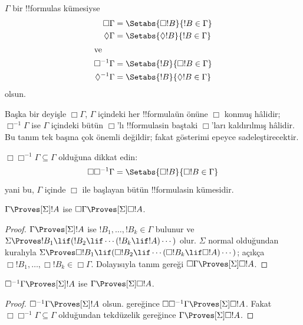 \documentclass[../../../include/open-logic-section]{subfiles}
\begin{document}
\begin{defn}
  $\Gamma$ bir !!{formula}s kümesiyse
  \begin{align*}
    \Box\Gamma & = \Setabs{\Box !B}{!B \in \Gamma}\\
    \Diamond\Gamma & = \Setabs{\Diamond !B}{!B \in \Gamma}\\
    \intertext{ve}
    \Box^{-1}\Gamma & = \Setabs{!B}{\Box !B \in \Gamma}\\
    \Diamond^{-1}\Gamma & = \Setabs{!B}{\Diamond !B \in \Gamma}\\
  \end{align*}
  olsun.
\end{defn}

Başka bir deyişle $\Box\Gamma$, $\Gamma$ içindeki her !!{formula}{}ün önüne
$\Box$ konmuş hâlidir; $\Box^{-1}\Gamma$ ise $\Gamma$ içindeki bütün
$\Box$'lı !!{formula}s{}in baştaki $\Box$'ları kaldırılmış hâlidir. Bu tanım
tek başına çok önemli değildir; fakat gösterimi epeyce sadeleştirecektir.

$\Box\Box^{-1}\Gamma\subseteq\Gamma$ olduğuna dikkat edin:
\[
\Box\Box^{-1}\Gamma = \Setabs{\Box!B}{\Box!B \in \Gamma}
\]
yani bu, $\Gamma$ içinde $\Box$ ile başlayan bütün !!{formula}s{}in kümesidir.

\begin{lem}
  $\Gamma\Proves[\Sigma]!A$ ise
  $\Box\Gamma\Proves[\Sigma]\Box!A$.
\end{lem}

\begin{proof}
  $\Gamma\Proves[\Sigma]!A$ ise $!B_1,\dots,!B_k\in\Gamma$ bulunur ve
  $\Sigma\Proves !B_1\lif(!B_2\lif\cdots(!B_k\lif !A)\cdots)$ olur.
  $\Sigma$ normal olduğundan \RK{} kuralıyla
  $\Sigma\Proves\Box!B_1\lif(\Box!B_2\lif\cdots(\Box!B_k\lif
  \Box!A)\cdots)$; açıkça $\Box!B_1,\dots,\Box!B_k\in\Box\Gamma$.
  Dolayısıyla tanım gereği $\Box\Gamma\Proves[\Sigma]\Box!A$.
\end{proof}

\begin{lem}
  $\Box^{-1}\Gamma\Proves[\Sigma]!A$ ise
  $\Gamma\Proves[\Sigma]\Box!A$.
\end{lem}

\begin{proof}
  $\Box^{-1}\Gamma\Proves[\Sigma]!A$ olsun.  gereğince
  $\Box\Box^{-1}\Gamma\Proves[\Sigma]\Box!A$. Fakat
  $\Box\Box^{-1}\Gamma\subseteq\Gamma$ olduğundan tekdüzelik gereğince
  $\Gamma\Proves[\Sigma]\Box!A$.
\end{proof}
\end{document}
